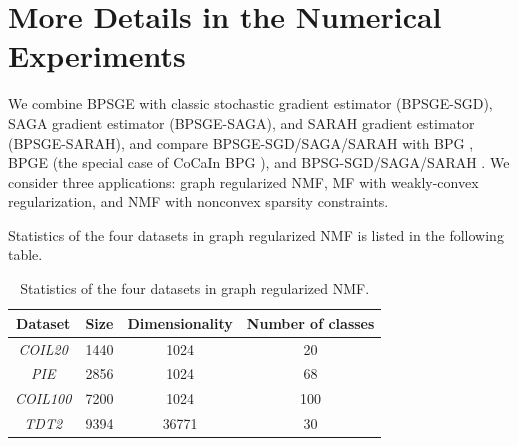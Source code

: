 \documentclass[letterpaper]{article} %
\begin{document}
	\section{More Details in the Numerical Experiments}\label{more_results}


	We combine BPSGE with classic stochastic gradient estimator \cite{RobbinsM1951} (BPSGE-SGD), SAGA gradient estimator \cite{DefazioBL14} (BPSGE-SAGA), and SARAH gradient estimator \cite{NguyenLST17} (BPSGE-SARAH), and compare BPSGE-SGD/SAGA/SARAH with BPG \cite{BolteSTV18First},   BPGE (the special case of CoCaIn BPG \cite{MukkamalaOPS20}), and BPSG-SGD/SAGA/SARAH \cite{WangH23}. We consider three applications: graph regularized NMF, MF with weakly-convex regularization, and NMF with nonconvex sparsity constraints.



	Statistics of the four datasets in graph regularized NMF is listed in the following table.
	\begin{table}[!ht]
		\centering
		\begin{tabular}{c|c|c|c}\hline
			Dataset& Size &Dimensionality     & Number of classes \\\hline
			\emph{COIL20} & 1440 & 1024 &20\\
			\emph{PIE} & 2856 &1024 & 68\\
			\emph{COIL100} & 7200 & 1024 &100\\
			\emph{TDT2} & 9394 & 36771 & 30\\\hline
		\end{tabular}
		\caption{Statistics of the four datasets in graph regularized NMF.}
		\label{GNMG_datasets}
	\end{table}
\end{document}
